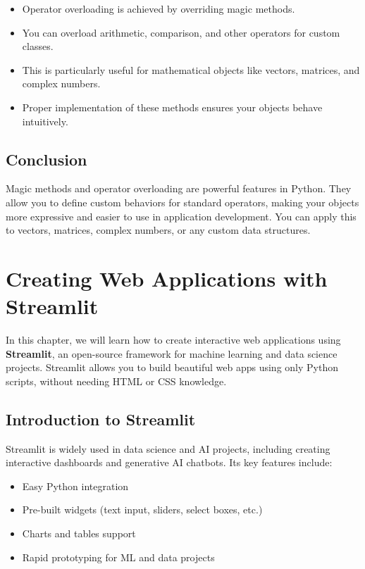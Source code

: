 \begin{itemize}
    \item Operator overloading is achieved by overriding magic methods.
    \item You can overload arithmetic, comparison, and other operators for custom classes.
    \item This is particularly useful for mathematical objects like vectors, matrices, and complex numbers.
    \item Proper implementation of these methods ensures your objects behave intuitively.
\end{itemize}

\section{Conclusion}

Magic methods and operator overloading are powerful features in Python. They allow you to define custom behaviors for standard operators, making your objects more expressive and easier to use in application development. You can apply this to vectors, matrices, complex numbers, or any custom data structures.

\chapter{Creating Web Applications with Streamlit}

In this chapter, we will learn how to create interactive web applications using \textbf{Streamlit}, an open-source framework for machine learning and data science projects. Streamlit allows you to build beautiful web apps using only Python scripts, without needing HTML or CSS knowledge.

\section{Introduction to Streamlit}

Streamlit is widely used in data science and AI projects, including creating interactive dashboards and generative AI chatbots. Its key features include:

\begin{itemize}
    \item Easy Python integration
    \item Pre-built widgets (text input, sliders, select boxes, etc.)
    \item Charts and tables support
    \item Rapid prototyping for ML and data projects
\end{itemize}

